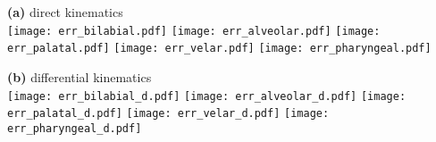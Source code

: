 \documentclass[varwidth=7in]{standalone}
\begin{document}
\raggedright

{\bf (a)} direct kinematics\\
\texttt{[image: err\_bilabial.pdf]}%
\texttt{[image: err\_alveolar.pdf]}%
\texttt{[image: err\_palatal.pdf]}%
\texttt{[image: err\_velar.pdf]}%
\texttt{[image: err\_pharyngeal.pdf]}

{\bf (b)} differential kinematics\\
\texttt{[image: err\_bilabial\_d.pdf]}%
\texttt{[image: err\_alveolar\_d.pdf]}%
\texttt{[image: err\_palatal\_d.pdf]}%
\texttt{[image: err\_velar\_d.pdf]}%
\texttt{[image: err\_pharyngeal\_d.pdf]}
\end{document}
